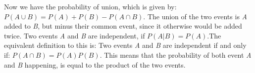 \noindent Now we have the probability of union, which is given by:
\newline
$P(A \cup B)=P(A)+P(B)-P(A \cap B)$.
\newline
The union of the two events is \textit{A} added to \textit{B}, but minus their common event, since it otherwise would be added twice. 
\newline
\noindent Two events \textit{A} and \textit{B} are independent, if $P(A|B)=P(A)$.The equivalent definition to this is: Two events \textit{A} and \textit{B} are independent if and only if: \newline
$P(A \cap B)=P(A)P(B).$ This means that the probability of both event \textit{A} and \textit{B} happening, is equal to the product of the two events.
